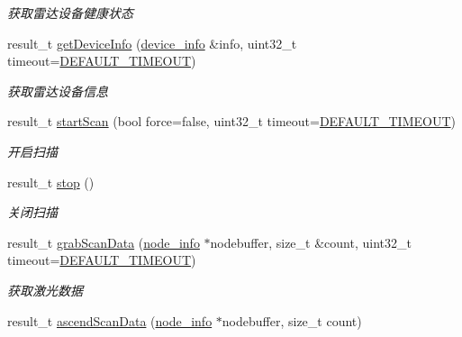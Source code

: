 \begin{DoxyCompactItemize}
\begin{DoxyCompactList}\small\item\em 获取雷达设备健康状态 ~\newline
\end{DoxyCompactList}\item 
result\+\_\+t \hyperlink{classydlidar_1_1_y_dlidar_driver_ab75303116c4ccb144ecc215e94114e1a}{get\+Device\+Info} (\hyperlink{structdevice__info}{device\+\_\+info} \&info, uint32\+\_\+t timeout=\hyperlink{classydlidar_1_1_y_dlidar_driver_a13a4f2dc4067b43794b2c47c06d5d27aa07c79ce96f468ff4b40495ef84584442}{D\+E\+F\+A\+U\+L\+T\+\_\+\+T\+I\+M\+E\+O\+UT})
\begin{DoxyCompactList}\small\item\em 获取雷达设备信息 ~\newline
\end{DoxyCompactList}\item 
result\+\_\+t \hyperlink{classydlidar_1_1_y_dlidar_driver_a62888da8520422b7daaae89c2935460b}{start\+Scan} (bool force=false, uint32\+\_\+t timeout=\hyperlink{classydlidar_1_1_y_dlidar_driver_a13a4f2dc4067b43794b2c47c06d5d27aa07c79ce96f468ff4b40495ef84584442}{D\+E\+F\+A\+U\+L\+T\+\_\+\+T\+I\+M\+E\+O\+UT})
\begin{DoxyCompactList}\small\item\em 开启扫描 ~\newline
\end{DoxyCompactList}\item 
result\+\_\+t \hyperlink{classydlidar_1_1_y_dlidar_driver_a7aa354e88eeb6984be4d18eae6367a0b}{stop} ()
\begin{DoxyCompactList}\small\item\em 关闭扫描 ~\newline
\end{DoxyCompactList}\item 
result\+\_\+t \hyperlink{classydlidar_1_1_y_dlidar_driver_a6d6e04efa9d7e5d4aea41ee53d4ea8af}{grab\+Scan\+Data} (\hyperlink{structnode__info}{node\+\_\+info} $\ast$nodebuffer, size\+\_\+t \&count, uint32\+\_\+t timeout=\hyperlink{classydlidar_1_1_y_dlidar_driver_a13a4f2dc4067b43794b2c47c06d5d27aa07c79ce96f468ff4b40495ef84584442}{D\+E\+F\+A\+U\+L\+T\+\_\+\+T\+I\+M\+E\+O\+UT})
\begin{DoxyCompactList}\small\item\em 获取激光数据 ~\newline
\end{DoxyCompactList}\item 
result\+\_\+t \hyperlink{classydlidar_1_1_y_dlidar_driver_a6494501f3fee2f6dc410f869bbc18cb9}{ascend\+Scan\+Data} (\hyperlink{structnode__info}{node\+\_\+info} $\ast$nodebuffer, size\+\_\+t count)

\end{DoxyCompactItemize}
